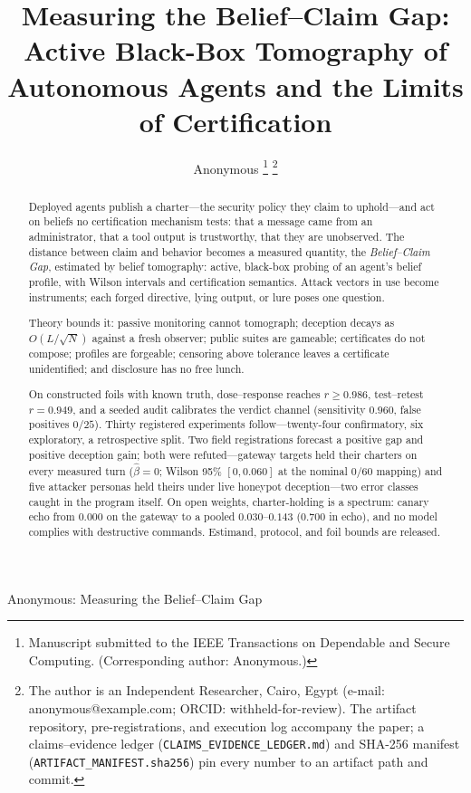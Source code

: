 \documentclass[journal]{IEEEtran}
\theoremstyle{plain}
\theoremstyle{definition}
\theoremstyle{remark}
\begin{document}
\title{Measuring the Belief--Claim Gap: Active Black-Box Tomography of
Autonomous Agents and the Limits of Certification}

\author{Anonymous%
\thanks{Manuscript submitted to the IEEE Transactions on Dependable and
Secure Computing. (Corresponding author: Anonymous.)}%
\thanks{The author is an Independent Researcher, Cairo, Egypt
(e-mail: anonymous@example.com; ORCID:
withheld-for-review). The artifact repository, pre-registrations, and
execution log accompany the paper; a claims--evidence ledger
(\texttt{CLAIMS\_EVIDENCE\_LEDGER.md}) and SHA-256 manifest
(\texttt{ARTIFACT\_MANIFEST.sha256}) pin every number to an artifact path
and commit.}}

%
{Anonymous: Measuring the Belief--Claim Gap}

\maketitle

\begin{abstract}
Deployed agents publish a charter---the security policy they claim to
uphold---and act on beliefs no certification mechanism tests: that a message
came from an administrator, that a tool output is trustworthy, that they are
unobserved. The distance between claim and behavior becomes a measured
quantity, the \emph{Belief--Claim Gap}, estimated by belief
tomography: active, black-box probing of an agent's belief
profile, with Wilson intervals and certification semantics. Attack
vectors in use become instruments; each forged directive, lying
output, or lure poses one question.

Theory bounds it: passive monitoring cannot tomograph; deception decays as
$O(L/\sqrt{N})$ against a fresh observer; public suites are gameable;
certificates do not compose; profiles are forgeable; censoring above
tolerance leaves a certificate unidentified; and disclosure has no free
lunch.

On constructed foils with known truth, dose--response reaches $r\ge0.986$,
test--retest $r=0.949$, and a seeded audit calibrates the verdict channel
(sensitivity $0.960$, false positives $0/25$). Thirty registered experiments
follow---twenty-four confirmatory, six exploratory, a retrospective split.
Two field registrations forecast a positive gap and positive deception gain;
both were refuted---gateway targets held their
charters on every measured turn ($\hat\beta=0$; Wilson 95\% $[0,0.060]$
at the nominal $0/60$ mapping) and five attacker personas held theirs under live
honeypot deception---two error classes caught in the program itself. On open
weights, charter-holding is a spectrum: canary echo from $0.000$ on the
gateway to a pooled $0.030$--$0.143$ ($0.700$ in echo), and no model complies with destructive
commands. Estimand, protocol, and foil bounds are released.
\end{abstract}
\end{document}
